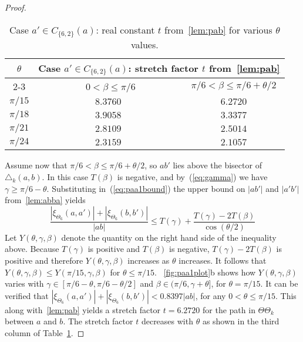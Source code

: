\documentclass[runningheads,a4paper]{llncs}
\newcommand{\pp}{\xi}
\begin{document}
\begin{proof}
\begin{table}[hptb]
\begin{center}
\begin{tabular} {|c|c|c|}
\hline
\multirow{3}{*}{$\theta$} & \multicolumn{2}{|c|}{Case $a' \in C_{\{6,2\}}(a)$: stretch factor $t$ from~\autoref{lem:pab}} \\
\cline{2-3}
& ~~~~~~~~~$0 < \beta \le \pi/6$~~~~~~~~ & $\pi/6 < \beta \le \pi/6+\theta/2$ \\
\hline
$\pi/15$ & $8.3760$ & $6.2720$ \\
$\pi/18$ & $3.9058$ & $3.3377$ \\
$\pi/21$ & $2.8109$ & $2.5014$ \\
$\pi/24$ & $2.3159$ & $2.1057$ \\
\hline
\end{tabular}
\end{center}
\caption{Case $a' \in C_{\{6,2\}}(a)$: real constant $t$ from~\autoref{lem:pab} for various $\theta$ values.}
\label{tab:paa1bound}
\end{table}

Assume now that $\pi/6 < \beta \le \pi/6+\theta/2$, so $ab'$ lies above the bisector of $\triangle_k(a, b)$. 
In this case $T(\beta)$ is negative, and by~(\ref{eq:gamma}) we have $\gamma \ge \pi/6-\theta$. Substituting in~(\ref{eq:paa1bound}) the upper bound on $|ab'|$ and $|a'b'|$ from~\autoref{lem:abba} yields
\begin{equation}
 \frac{ |\pp_{\Theta_6}(a, a')| +  |\pp_{\Theta_6}(b, b')|}{|ab|} \le  T(\gamma) + \frac{T(\gamma)-2T(\beta)}{\cos(\theta/2)}
\label{eq:paa1bound2}
\end{equation}
Let $Y(\theta, \gamma, \beta)$ denote the quantity on the right hand side of the inequality above.  Because $T(\gamma)$ is positive and $T(\beta)$ is negative, $T(\gamma)-2T(\beta)$ is positive and therefore  $Y(\theta, \gamma, \beta)$ increases as $\theta$ increases. It follows that $Y(\theta, \gamma, \beta) \le Y(\pi/15, \gamma, \beta)$ for $\theta \le \pi/15$. ~\autoref{fig:paa1plot}b shows how $Y(\theta, \gamma, \beta)$ varies with $\gamma \in [\pi/6-\theta, \pi/6-\theta/2]$ and $\beta \in (\pi/6, \gamma+\theta]$, for $\theta = \pi/15$. It can be verified that 
$|\pp_{\Theta_6}(a, a')|+  |\pp_{\Theta_6}(b, b')|  < 0.8397 |ab|$, for any $0 < \theta \le \pi/15$.
This along with~\autoref{lem:pab} yields a stretch factor $t = 6.2720$ for the path in $\Theta\Theta_{k}$ between $a$ and $b$. 
The stretch factor $t$ decreases with $\theta$ as shown in the third column of Table~\ref{tab:paa1bound}. 




\end{proof}
\end{document}
